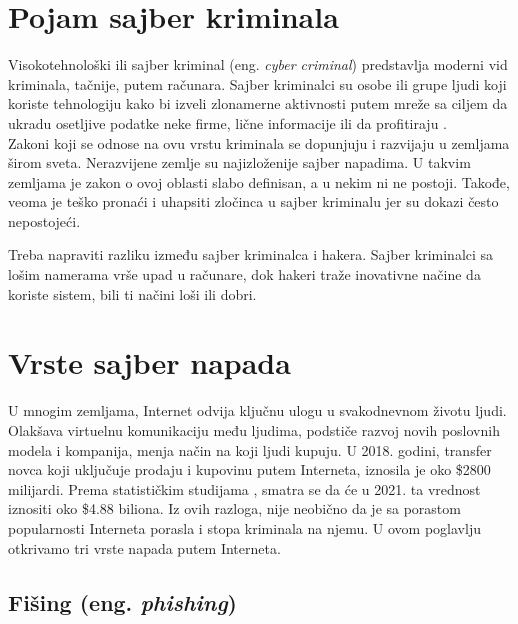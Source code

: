 \documentclass[a4paper]{article}
\theoremstyle{break}
\begin{document}
{\section{Pojam sajber kriminala}
\label{pojam}

Visokotehnološki ili sajber kriminal (eng. {\em cyber criminal}) predstavlja moderni vid kriminala, tačnije, putem računara. Sajber kriminalci su osobe ili grupe ljudi koji koriste tehnologiju kako bi izveli zlonamerne aktivnosti putem mreže sa ciljem da ukradu osetljive podatke neke firme, lične informacije ili da profitiraju \cite{sajber}.
\\Zakoni koji se odnose na ovu vrstu kriminala se dopunjuju i razvijaju u zemljama širom sveta. Nerazvijene zemlje su najizloženije sajber napadima. U takvim zemljama je zakon o ovoj oblasti slabo definisan, a u nekim ni ne postoji. Takođe, veoma je teško pronaći i uhapsiti zločinca u sajber kriminalu jer su dokazi često nepostojeći.

Treba napraviti razliku između sajber kriminalca i hakera. Sajber kriminalci sa lošim namerama vrše upad u računare, dok hakeri traže inovativne načine da koriste sistem, bili ti načini loši ili dobri.
\\

 

\section{Vrste sajber napada}

\label{sec:vrste_sajber_napada}

U mnogim zemljama, Internet odvija ključnu ulogu u svakodnevnom životu ljudi. Olakšava virtuelnu komunikaciju među ljudima, podstiče razvoj novih poslovnih modela i kompanija, menja način na koji ljudi kupuju. U 2018. godini, transfer novca koji uključuje prodaju i kupovinu putem Interneta, iznosila je oko \$2800 milijardi. Prema statističkim studijama \cite{statistika}, smatra se da će u 2021. ta vrednost iznositi oko \$4.88 biliona. Iz ovih razloga, nije neobično da je sa porastom popularnosti Interneta porasla i stopa kriminala na njemu. U ovom poglavlju otkrivamo tri vrste napada putem Interneta.

\subsection{Fišing (eng. {\em phishing})}
\label{subsec:phishing}

}
\end{document}
